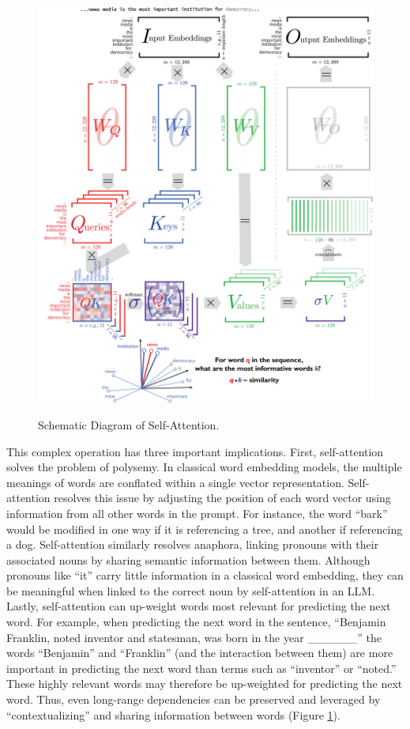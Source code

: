\documentclass{article}
\begin{document}
\FloatBarrier
\begin{figure}[p]
  \captionsetup{justification=raggedright,singlelinecheck=false}
  \caption{Schematic Diagram of Self-Attention.}
  \centering
  \includegraphics[width=\textwidth, height=\textheight, keepaspectratio]{./figures/media/image18.png}
  \label{fig:schematic1}
\end{figure}
\FloatBarrier

This complex operation has three important implications. First,
self-attention solves the problem of polysemy. In classical word
embedding models, the multiple meanings of words are conflated within a
single vector representation. Self-attention resolves this issue by
adjusting the position of each word vector using information from all
other words in the prompt. For instance, the word ``bark'' would be
modified in one way if it is referencing a tree, and another if
referencing a dog. Self-attention similarly resolves anaphora, linking
pronouns with their associated nouns by sharing semantic information
between them. Although pronouns like ``it'' carry little information in
a classical word embedding, they can be meaningful when linked to the
correct noun by self-attention in an LLM. Lastly, self-attention can
up-weight words most relevant for predicting the next word. For example,
when predicting the next word in the sentence, ``Benjamin Franklin,
noted inventor and statesman, was born in the year \_\_\_\_\_\_'' the
words ``Benjamin'' and ``Franklin'' (and the interaction between them)
are more important in predicting the next word than terms such as
``inventor'' or ``noted.'' These highly relevant words may therefore be
up-weighted for predicting the next word. Thus, even long-range
dependencies can be preserved and leveraged by ``contextualizing'' and
sharing information between words (Figure \ref{fig:schematic1}).
\end{document}
